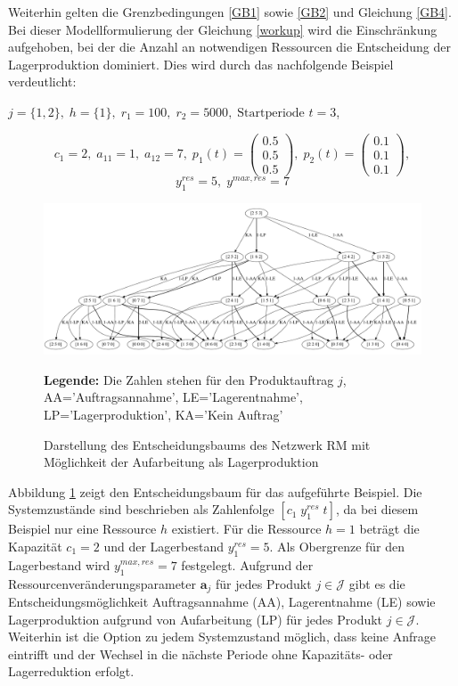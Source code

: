 Weiterhin gelten die Grenzbedingungen \eqref{GB1} sowie \eqref{GB2} und Gleichung \eqref{GB4}. Bei dieser Modellformulierung der Gleichung \eqref{workup} wird die Einschränkung aufgehoben, bei der die Anzahl an notwendigen Ressourcen die Entscheidung der Lagerproduktion dominiert. Dies wird durch das nachfolgende Beispiel verdeutlicht:
\begin{center}
$j = \{1, 2\}, \; h = \{1\}, \; r_{1} = 100, \; r_{2} = 5000, \; \text{Startperiode } t=3$,
\end{center}
\[
    c_{1}=2, \;
    a_{11}=1, \;
     a_{12}=7, \;
     p_{1}(t)=\begin{pmatrix} 0.5\\ 0.5\\ 0.5  \end{pmatrix}, \;
     p_{2}(t)=\begin{pmatrix} 0.1\\ 0.1\\ 0.1  \end{pmatrix},
  \]
  \[
    y_{1}^{res}= 5, \;
    y^{max,res}=7
      \]
\begin{figure}[h!]
  \begin{center}
    \includegraphics[width=130mm]{Bilder/Beispiel5.pdf}
    \caption{Darstellung des Entscheidungsbaums des Netzwerk RM mit Möglichkeit der Aufarbeitung als Lagerproduktion}  \label{B5}
    {\footnotesize \textbf{Legende:} Die Zahlen stehen für den Produktauftrag $j$, AA='Auftragsannahme', LE='Lagerentnahme', LP='Lagerproduktion', KA='Kein Auftrag'} 
  \end{center}
\end{figure}

Abbildung \ref{B5} zeigt den Entscheidungsbaum für das aufgeführte Beispiel. Die Systemzustände sind beschrieben als Zahlenfolge $[c_{1}\; y_{1}^{res}\;t]$, da bei diesem Beispiel nur eine Ressource $h$ existiert. Für die Ressource $h=1$ beträgt die Kapazität $c_{1}=2$ und der Lagerbestand $y_{1}^{res}=5$. Als Obergrenze für den Lagerbestand wird $y_{1}^{max,res}=7$ festgelegt. Aufgrund der Ressourcenveränderungsparameter $\textbf{a}_{j}$ für jedes Produkt $j\in\mathcal{J}$ gibt es die Entscheidungsmöglichkeit Auftragsannahme (AA), Lagerentnahme (LE) sowie Lagerproduktion aufgrund von Aufarbeitung (LP) für jedes Produkt $j\in\mathcal{J}$. Weiterhin ist die Option zu jedem Systemzustand möglich, dass keine Anfrage eintrifft und der Wechsel in die nächste Periode ohne Kapazitäts- oder Lagerreduktion erfolgt.

